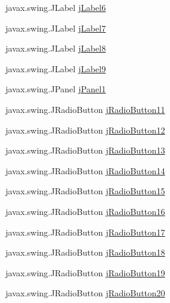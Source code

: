 \begin{DoxyCompactItemize}
javax.\+swing.\+J\+Label \hyperlink{classTrainControllerComps_1_1TCTestConsole_a295d6d79a5053490f1e9ed4f49063369}{j\+Label6}
\item 
javax.\+swing.\+J\+Label \hyperlink{classTrainControllerComps_1_1TCTestConsole_a56061314e64982fd14f12f8c157bc446}{j\+Label7}
\item 
javax.\+swing.\+J\+Label \hyperlink{classTrainControllerComps_1_1TCTestConsole_af5c88ee6fdf8514186e4be2e0367222d}{j\+Label8}
\item 
javax.\+swing.\+J\+Label \hyperlink{classTrainControllerComps_1_1TCTestConsole_a82965e977b9eab5384711fa7dae2c7df}{j\+Label9}
\item 
javax.\+swing.\+J\+Panel \hyperlink{classTrainControllerComps_1_1TCTestConsole_af78b45798e2b3493704987ebd4fcdec5}{j\+Panel1}
\item 
javax.\+swing.\+J\+Radio\+Button \hyperlink{classTrainControllerComps_1_1TCTestConsole_a4841a010a5d290e5ccd4ab08c0660cdd}{j\+Radio\+Button11}
\item 
javax.\+swing.\+J\+Radio\+Button \hyperlink{classTrainControllerComps_1_1TCTestConsole_afabaa89b5791c44f113a704f26f0653d}{j\+Radio\+Button12}
\item 
javax.\+swing.\+J\+Radio\+Button \hyperlink{classTrainControllerComps_1_1TCTestConsole_aba8a4cf1aec37a400b88f24df6e6b00f}{j\+Radio\+Button13}
\item 
javax.\+swing.\+J\+Radio\+Button \hyperlink{classTrainControllerComps_1_1TCTestConsole_ac8e7e27aa2da7d8b20473de214f55545}{j\+Radio\+Button14}
\item 
javax.\+swing.\+J\+Radio\+Button \hyperlink{classTrainControllerComps_1_1TCTestConsole_a0ae60a752f0dba23f979a55cb862751f}{j\+Radio\+Button15}
\item 
javax.\+swing.\+J\+Radio\+Button \hyperlink{classTrainControllerComps_1_1TCTestConsole_aec997692de4894a4428e3bf6b665d319}{j\+Radio\+Button16}
\item 
javax.\+swing.\+J\+Radio\+Button \hyperlink{classTrainControllerComps_1_1TCTestConsole_aa0785089513677993651b2ec2401acd9}{j\+Radio\+Button17}
\item 
javax.\+swing.\+J\+Radio\+Button \hyperlink{classTrainControllerComps_1_1TCTestConsole_af96dfe5ab6c3939fd1f1107052b32860}{j\+Radio\+Button18}
\item 
javax.\+swing.\+J\+Radio\+Button \hyperlink{classTrainControllerComps_1_1TCTestConsole_add689f3cb879f656ce537f7b0de37790}{j\+Radio\+Button19}
\item 
javax.\+swing.\+J\+Radio\+Button \hyperlink{classTrainControllerComps_1_1TCTestConsole_a637db2168f9d0e3c3d36b084fe376667}{j\+Radio\+Button20}

\end{DoxyCompactItemize}
